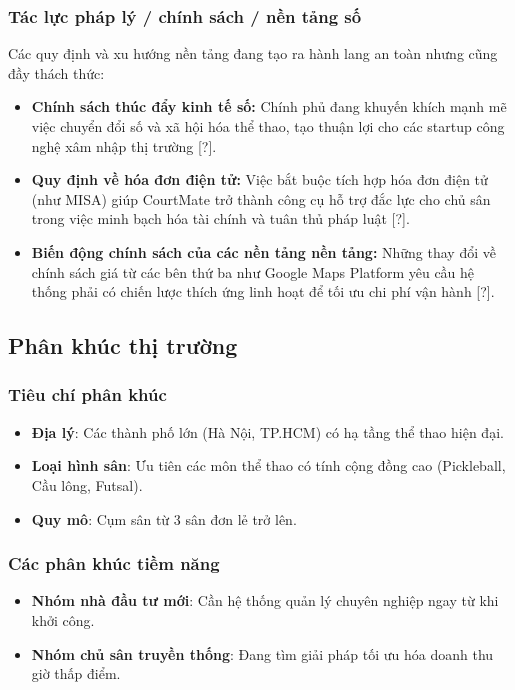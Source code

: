 \subsubsection{Tác lực pháp lý / chính sách / nền tảng số}
Các quy định và xu hướng nền tảng đang tạo ra hành lang an toàn nhưng cũng đầy thách thức:
\begin{itemize}
    \item \textbf{Chính sách thúc đẩy kinh tế số:} Chính phủ đang khuyến khích mạnh mẽ việc chuyển đổi số và xã hội hóa thể thao, tạo thuận lợi cho các startup công nghệ xâm nhập thị trường [?].
    \item \textbf{Quy định về hóa đơn điện tử:} Việc bắt buộc tích hợp hóa đơn điện tử (như MISA) giúp CourtMate trở thành công cụ hỗ trợ đắc lực cho chủ sân trong việc minh bạch hóa tài chính và tuân thủ pháp luật [?].
    \item \textbf{Biến động chính sách của các nền tảng nền tảng:} Những thay đổi về chính sách giá từ các bên thứ ba như Google Maps Platform yêu cầu hệ thống phải có chiến lược thích ứng linh hoạt để tối ưu chi phí vận hành [?].
\end{itemize}

\subsection{Phân khúc thị trường}
\subsubsection{Tiêu chí phân khúc}
\begin{itemize}
    \item \textbf{Địa lý}: Các thành phố lớn (Hà Nội, TP.HCM) có hạ tầng thể thao hiện đại.
    \item \textbf{Loại hình sân}: Ưu tiên các môn thể thao có tính cộng đồng cao (Pickleball, Cầu lông, Futsal).
    \item \textbf{Quy mô}: Cụm sân từ 3 sân đơn lẻ trở lên.
\end{itemize}

\subsubsection{Các phân khúc tiềm năng}
\begin{itemize}
    \item \textbf{Nhóm nhà đầu tư mới}: Cần hệ thống quản lý chuyên nghiệp ngay từ khi khởi công.
    \item \textbf{Nhóm chủ sân truyền thống}: Đang tìm giải pháp tối ưu hóa doanh thu giờ thấp điểm.
\end{itemize}

